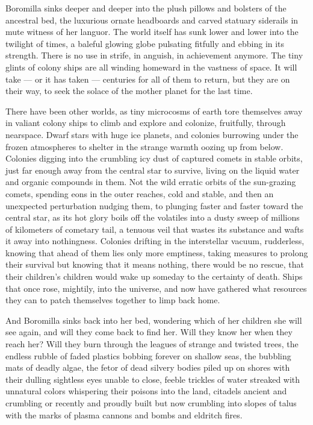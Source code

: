 
Boromilla sinks deeper and deeper into the plush pillows and bolsters of
the ancestral bed, the luxurious ornate headboards and carved statuary
siderails in mute witness of her languor. The world itself has sunk
lower and lower into the twilight of times, a baleful glowing globe
pulsating fitfully and ebbing in its strength. There is no use in
strife, in anguish, in achievement anymore. The tiny glints of colony
ships are all winding homeward in the vastness of space. It will take ---
or it has taken --- centuries for all of them to return, but they are on
their way, to seek the solace of the mother planet for the last time.

There have been other worlds, as tiny microcosms of earth tore
themselves away in valiant colony ships to climb and explore and
colonize, fruitfully, through nearspace. Dwarf stars with huge ice
planets, and colonies burrowing under the frozen atmospheres to shelter
in the strange warmth oozing up from below. Colonies digging into the
crumbling icy dust of captured comets in stable orbits, just far enough
away from the central star to survive, living on the liquid water and
organic compounds in them. Not the wild erratic orbits of the
sun-grazing comets, spending eons in the outer reaches, cold and stable,
and then an unexpected perturbation nudging them, to plunging faster and
faster toward the central star, as its hot glory boils off the volatiles
into a dusty sweep of millions of kilometers of cometary tail, a tenuous
veil that wastes its substance and wafts it away into nothingness.
Colonies drifting in the interstellar vacuum, rudderless, knowing that
ahead of them lies only more emptiness, taking measures to prolong their
survival but knowing that it means nothing, there would be no rescue,
that their children's children would wake up someday to the certainty of
death. Ships that once rose, mightily, into the universe, and now have
gathered what resources they can to patch themselves together to limp
back home.

And Boromilla sinks back into her bed, wondering which of her children
she will see again, and will they come back to find her. Will they know
her when they reach her? Will they burn through the leagues of strange
and twisted trees, the endless rubble of faded plastics bobbing forever
on shallow seas, the bubbling mats of deadly algae, the fetor of dead
silvery bodies piled up on shores with their dulling sightless eyes
unable to close, feeble trickles of water streaked with unnatural colors
whispering their poisons into the land, citadels ancient and crumbling
or recently and proudly built but now crumbling into slopes of talus
with the marks of plasma cannons and bombs and eldritch fires.

